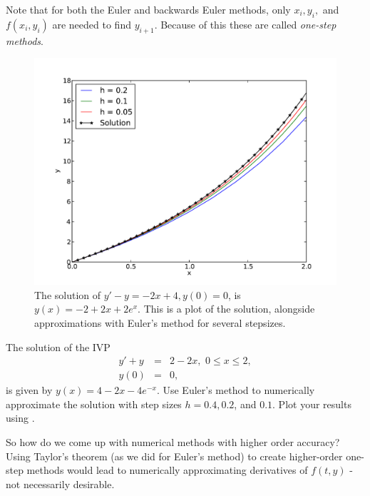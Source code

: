 Note that for both the Euler and backwards Euler methods, only $x_i, y_i,$ and $f(x_i,y_i)$ are needed to find $y_{i+1}$. Because of this these are called \textit{one-step methods}. 




\begin{figure}[ht]
\centering
\includegraphics[width=\textwidth]{Fig1.pdf}
\caption{The solution of $y' -y= -2x+4, y(0) = 0$, is $y(x) = -2+2x + 2e^x.$ This is a plot of the solution, alongside approximations with Euler's method for several stepsizes.}
\label{ivp:euler}
\end{figure}



\begin{problem}
The solution of the IVP
\begin{eqnarray*}
y' + y &=& 2-2x,\,\, 0 \leq x \leq 2, \\
y(0) &=& 0,
\end{eqnarray*}
is given by $y(x) = 4-2x -4e^{-x}$. Use Euler's method to numerically approximate the solution
with step sizes $h = 0.4, 0.2$, and $0.1.$ Plot your results using .
\end{problem}



So how do we come up with numerical methods with higher order accuracy? Using Taylor's theorem (as we did for Euler's method) to create higher-order one-step methods would lead to numerically approximating derivatives of $f(t,y)$ - not necessarily desirable. 

